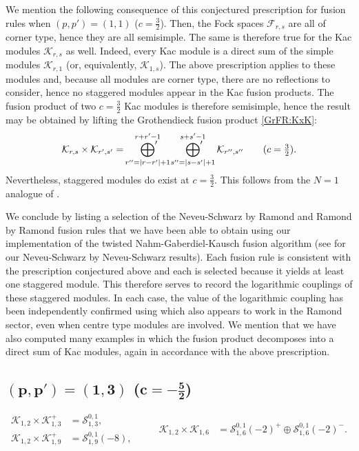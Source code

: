 \documentclass[a4paper,reqno,12pt]{report}
\theoremstyle{definition}
\numberwithin{equation}{section}
\let\originalleft\left     %
\let\originalright\right
\renewcommand{\left}{\mathopen{}\mathclose\bgroup\originalleft}
\renewcommand{\right}{\aftergroup\egroup\originalright}
\newcommand{\abs}[1]{\left\lvert #1 \right\rvert}
\newcommand{\Kac}[1]{\mathcal{K}_{#1}}       %
\newcommand{\Fock}[1]{\mathcal{F}_{#1}}      %
\newcommand{\Stag}[2]{\mathcal{S}_{#1}^{#2}} %
\newcommand{\fuse}{\mathbin{\times}}                                            %
\newcommand{\NGK}{Nahm-Gaberdiel-Kausch}
\newcommand{\ns}{Neveu-Schwarz}
\theoremstyle{plain}
\begin{document}
We mention the following consequence of this conjectured prescription for fusion rules when $(p,p')=(1,1)$ ($c=\frac{3}{2}$).  Then, the Fock spaces $\Fock{r,s}$ are all of corner type, hence they are all semisimple.  The same is therefore true for the Kac modules $\Kac{r,s}$ as well.  Indeed, every Kac module is a direct sum of the simple modules $\Kac{r,1}$ (or, equivalently, $\Kac{1,s}$).  The above prescription applies to these modules and, because all modules are corner type, there are no reflections to consider, hence no staggered modules appear in the Kac fusion products.  The fusion product of two $c=\frac{3}{2}$ Kac modules is therefore semisimple, hence the result may be obtained by lifting the Grothendieck fusion product \eqref{GrFR:KxK}:
\begin{equation}
\Kac{r,s} \fuse \Kac{r',s'} = \sideset{}{'} \bigoplus_{r''=\abs{r-r'}+1}^{r+r'-1} \sideset{}{'} \bigoplus_{s''=\abs{s-s'}+1}^{s+s'-1} \Kac{r'',s''} \qquad \text{(\(c = \tfrac{3}{2}\)).}
\end{equation}
Nevertheless, staggered modules do exist at $c=\frac{3}{2}$.  This follows from the $N=1$ analogue of \cite[Prop.~7.5]{RidSta09}.

We conclude by listing a selection of the \ns{} by Ramond and Ramond by Ramond fusion rules that we have been able to obtain using our implementation of the twisted \NGK{} fusion algorithm (see \cite[App.~C]{CanFusI15} for our \ns{} by \ns{} results).  Each fusion rule is consistent with the prescription conjectured above and each is selected because it yields at least one staggered module.  This therefore serves to record the logarithmic couplings of these staggered modules.  In each case, the value of the logarithmic coupling has been independently confirmed using \cite[Eq.~(B.5)]{CanFusI15} which also appears to work in the Ramond sector, even when centre type modules are involved.  We mention that we have also computed many examples in which the fusion product decomposes into a direct sum of Kac modules, again in accordance with the above prescription.

\subsection*{$\bm{(p,p') = (1,3)}$ ($\bm{c=-\frac{5}{2}}$)}

\begin{equation}
\begin{aligned}
  \Kac{1,2}\fuse \Kac{1,3}^+ &= \Stag{1,3}{0,1}, \\
  \Kac{1,2}\fuse \Kac{1,9}^+ &= \Stag{1,9}{0,1}(-8),
\end{aligned}
\qquad
\begin{aligned}
  \Kac{1,2}\fuse \Kac{1,6} &= \Stag{1,6}{0,1}(-2)^+ \oplus \Stag{1,6}{0,1}(-2)^-.
\end{aligned}
\end{equation}
\end{document}
